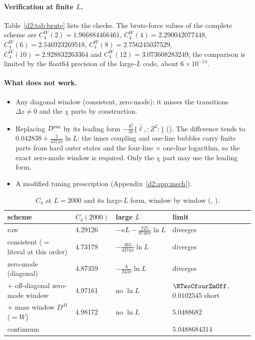 \paragraph{Verification at finite $L$.} Table~\ref{d2:tab:brute} lists the checks. The brute-force values of the complete
scheme are $C_4^W(2)=1.966884466461$, $C_4^W(4)=2.290042077448$, $C_4^W(6)=2.546923269518$, $C_4^W(8)=2.756245037529$,
$C_4^W(10)=2.928832263364$ and $C_4^W(12)=3.073608283249$; the comparison is limited by the float64 precision of the
large-$L$ code, about $6\times10^{-14}$.

\paragraph{What does not work.}
\begin{itemize}
\item Any diagonal window (consistent, zero-mode): it misses the transitions $\Delta z\neq0$ and the $\chi$ parts by
 construction.
\item Replacing $D^{\rm zm}$ by its leading form $-\frac{g_1^2}{3\pi}\{\hat\ell,{:}Z^2{:}\}$ (). The
 difference tends to $0.042838+\frac5{4374\pi}\ln L$: the inner coupling and one-line bubbles carry finite parts from hard
 outer states and the four-line $\times$ one-line logarithm, so the exact zero-mode window is required. Only the $\chi$ part
 may use the leading form.
\item A modified tuning prescription (Appendix~\ref{d2:app:mech}).
\end{itemize}

\begin{table}[ht]
\centering\footnotesize\renewcommand{\arraystretch}{1.15}
\begin{tabular}{@{}p{5.6cm}lp{4.3cm}p{3.2cm}@{}}
\toprule
scheme & $C_4(2000)$ & large $L$ & limit \\\midrule
raw & 4.29126 & $-\kappa L-\frac{725}{8748\pi}\ln L$ & diverges \\
consistent ($=$ literal at this order) & 4.73178 & $-\frac{365}{4374\pi}\ln L$ & diverges \\
zero-mode (diagonal) & 4.87359 & $-\frac8{243\pi}\ln L$ & diverges \\
$+$ off-diagonal zero-mode window & 4.97161 & no $\ln L$ & $\NTwoCfourZmOff$, $0.0102545$ short \\
$+$ mass window $D^M$ ($=W$) & 4.98172 & no $\ln L$ & $5.0488682$ \\
\midrule
continuum & & & $5.0488684314$ \\
\bottomrule
\end{tabular}
\caption{$C_4$ at $L=2000$ and its large-$L$ form, window by window (,
).}
\label{d2:tab:c4w}
\end{table}


